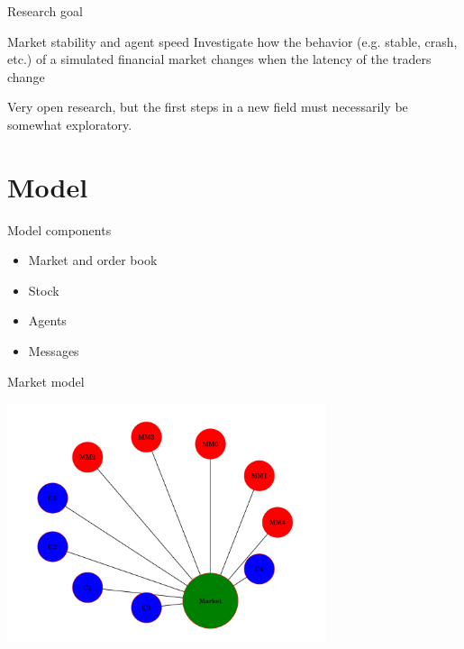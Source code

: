 \documentclass[14pt]{beamer}
\begin{document}
\begin{frame}{Research goal}
\begin{block}{Market stability and agent speed}
Investigate how the behavior (e.g. stable, crash, etc.) of a simulated financial market changes when the latency of the traders change
\end{block}
Very open research, but the first steps in a new field must necessarily be somewhat exploratory.
\end{frame}


%






\section{Model}
\begin{frame}
\tableofcontents[currentsection]
\end{frame}

\begin{frame}{Model components}
\begin{itemize}
\item Market and order book
\item Stock
\item Agents
\item Messages
\end{itemize}
\end{frame}

\begin{frame}{Market model}
\begin{center}
\includegraphics[width=0.7\textwidth]{graph.png}
\end{center}
\end{frame}
\end{document}
